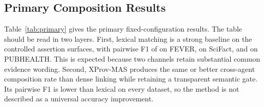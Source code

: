 \documentclass{ieeeaccess}
\begin{document}
\subsection{Primary Composition Results}
Table~\ref{tab:primary} gives the primary fixed-configuration results. The table should be read in two layers. First, lexical matching is a strong baseline on the controlled assertion surfaces, with pairwise F1 of \FEVERLexicalFOne on FEVER, \SciFactLexicalFOne on SciFact, and \PubHealthLexicalFOne on PUBHEALTH. This is expected because two channels retain substantial common evidence wording. Second, XProv-MAS produces the same or better cross-agent composition rate than dense linking while retaining a transparent semantic gate. Its pairwise F1 is lower than lexical on every dataset, so the method is not described as a universal accuracy improvement.
\end{document}
